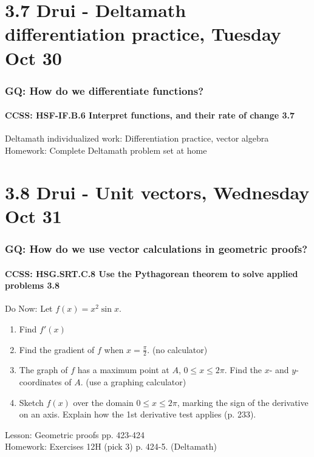\documentclass{beamer}
\begin{document}
\section{3.7 Drui - Deltamath differentiation practice, Tuesday Oct 30}
  \frame
  {
    \frametitle{GQ: How do we differentiate functions?}
    \framesubtitle{CCSS: HSF-IF.B.6 Interpret functions, and their rate of change  \alert{3.7}}


    Deltamath individualized work: Differentiation practice, vector algebra \\ \bigskip
    Homework: Complete Deltamath problem set at home
  }

\section{3.8 Drui - Unit vectors, Wednesday Oct 31}
  \frame
  {
    \frametitle{GQ: How do we use vector calculations in geometric proofs?}
    \framesubtitle{CCSS: HSG.SRT.C.8 Use the Pythagorean theorem to solve applied problems \qquad \alert{3.8}}
    \begin{block}{Do Now: Let $f(x)=x^2 \sin x$.}
    \begin{enumerate}
        \item Find $f'(x)$
        \item Find the gradient of $f$ when $x= \frac{\pi}{2}$. (no calculator)
        \item The graph of $f$ has a maximum point at $A$, $0 \leq x \leq 2\pi$. Find the $x$- and $y$-coordinates of $A$. (use a graphing calculator)
        \item Sketch $f(x)$ over the domain $0 \leq x \leq 2\pi$, marking the sign of the derivative on an axis. Explain how the 1st derivative test applies (p. 233).
      \end{enumerate}
      \end{block}

    Lesson: Geometric proofs pp. 423-424\\ \bigskip
    Homework: Exercises 12H (pick 3) p. 424-5. (Deltamath)
  }
\end{document}
